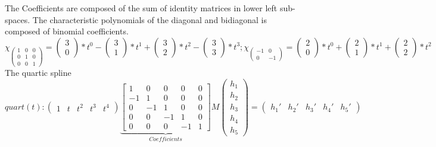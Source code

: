 \documentclass[a4paper,landscape]{report}
\begin{document}
The Coefficients are composed of the sum of identity matrices in lower left sub-spaces.
The characteristic polynomials of the diagonal and bidiagonal is composed of binomial coefficients.
\begin{equation}
\chi_{\begin{pmatrix}1 & 0 & 0\\0 & 1 & 0\\0 & 0 & 1\end{pmatrix}} = \begin{pmatrix}3 \\ 0\end{pmatrix}*t^0 - \begin{pmatrix}3 \\ 1\end{pmatrix}*t^1 + \begin{pmatrix}3 \\ 2\end{pmatrix}*t^2 - \begin{pmatrix}3 \\ 3\end{pmatrix}*t^3;
\chi_{\begin{pmatrix}-1 & 0\\0 & -1\end{pmatrix}} = \begin{pmatrix}2 \\ 0\end{pmatrix}*t^0 + \begin{pmatrix}2 \\ 1\end{pmatrix}*t^1 + \begin{pmatrix}2 \\ 2\end{pmatrix}*t^2
\end{equation}
The quartic spline
\begin{equation}
quart(t):
\begin{pmatrix}
1 & t & t^2 & t^3 & t^4
\end{pmatrix}
\underbrace{\begin{bmatrix}
1 & 0 & 0 & 0 & 0\\
-1 & 1 & 0 & 0 & 0\\
0 & -1 &1 & 0 & 0\\
0 & 0 & -1 & 1 & 0\\
0 & 0 & 0 & -1 & 1
\end{bmatrix}}_{Coefficients}
M
\begin{pmatrix}
h_{1} \\
h_{2} \\
h_{3} \\
h_{4} \\
h_{5}
\end{pmatrix}
=
\begin{pmatrix}
h_{1}' & h_{2}' & h_{3}' & h_{4}' & h_{5}'
\end{pmatrix}
\end{equation}
\end{document}
